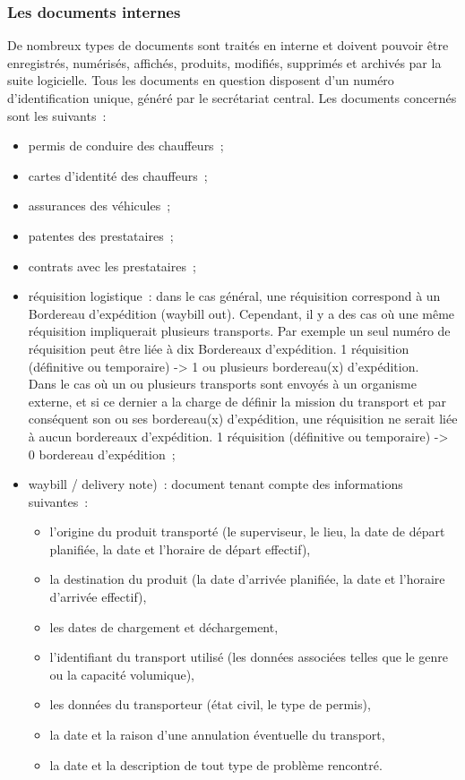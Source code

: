\subsubsection{Les documents internes}
De nombreux types de documents sont traités en interne et doivent pouvoir être enregistrés, numérisés, affichés, produits, modifiés, supprimés et archivés par la suite logicielle. Tous les documents en question disposent d'un numéro d'identification unique, généré par le secrétariat central. Les documents concernés sont les suivants~:
\begin{itemize}
	\item permis de conduire des chauffeurs~;
	\item cartes d'identité des chauffeurs~;
	\item assurances des véhicules~;
	\item patentes des prestataires~;
	\item contrats avec les prestataires~;
	\item réquisition logistique~: dans le cas général, une réquisition correspond à un Bordereau d'expédition (waybill out). Cependant, il y a des cas où une même réquisition impliquerait plusieurs transports. Par exemple un seul numéro de réquisition peut être liée à dix Bordereaux d'expédition. 1 réquisition (définitive ou temporaire) -> 1 ou plusieurs bordereau(x) d'expédition.
\\
Dans le cas où un ou plusieurs transports sont envoyés à un organisme externe, et si ce dernier a la charge de définir la mission du transport et par conséquent son ou ses bordereau(x) d'expédition, une réquisition ne serait liée à aucun bordereaux d'expédition. 1 réquisition (définitive ou temporaire) -> 0 bordereau d'expédition~;
	\item waybill / delivery note)~: document tenant compte des informations suivantes~:
	\begin{itemize}
		\item l'origine du produit transporté (le superviseur, le lieu, la date de départ planifiée, la date et l'horaire de départ effectif),
		\item la destination du produit (la date d'arrivée planifiée, la date et l'horaire d'arrivée effectif),
		\item les dates de chargement et déchargement,
		\item l'identifiant du transport utilisé (les données associées telles que le genre ou la capacité volumique),
		\item les données du transporteur (état civil, le type de permis),
		\item la date et la raison d'une annulation éventuelle du transport,
		\item la date et la description de tout type de problème rencontré.
	\end{itemize}
\end{itemize}

